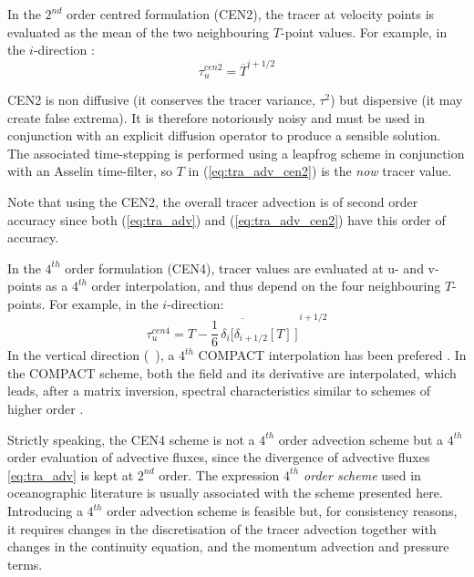 \documentclass[../main/NEMO_manual]{subfiles}
\begin{document}
In the $2^{nd}$ order centred formulation (CEN2), the tracer at velocity points is evaluated as the mean of
the two neighbouring $T$-point values.
For example, in the $i$-direction :
\begin{equation}
  \label{eq:tra_adv_cen2}
  \tau_u^{cen2} = \overline T ^{i + 1/2}
\end{equation}

CEN2 is non diffusive (\ie it conserves the tracer variance, $\tau^2$) but dispersive
(\ie it may create false extrema).
It is therefore notoriously noisy and must be used in conjunction with an explicit diffusion operator to
produce a sensible solution.
The associated time-stepping is performed using a leapfrog scheme in conjunction with an Asselin time-filter,
so $T$ in (\autoref{eq:tra_adv_cen2}) is the \textit{now} tracer value.

Note that using the CEN2, the overall tracer advection is of second order accuracy since
both (\autoref{eq:tra_adv}) and (\autoref{eq:tra_adv_cen2}) have this order of accuracy.


In the $4^{th}$ order formulation (CEN4), tracer values are evaluated at u- and v-points as
a $4^{th}$ order interpolation, and thus depend on the four neighbouring $T$-points.
For example, in the $i$-direction:
\begin{equation}
  \label{eq:tra_adv_cen4}
  \tau_u^{cen4} = \overline{T - \frac{1}{6} \, \delta_i \Big[ \delta_{i + 1/2}[T] \, \Big]}^{\,i + 1/2}
\end{equation}
In the vertical direction (~),
a $4^{th}$ COMPACT interpolation has been prefered \citep{Demange_PhD2014}.
In the COMPACT scheme, both the field and its derivative are interpolated, which leads, after a matrix inversion,
spectral characteristics similar to schemes of higher order \citep{Lele_JCP1992}. 

Strictly speaking, the CEN4 scheme is not a $4^{th}$ order advection scheme but
a $4^{th}$ order evaluation of advective fluxes,
since the divergence of advective fluxes \autoref{eq:tra_adv} is kept at $2^{nd}$ order.
The expression \textit{$4^{th}$ order scheme} used in oceanographic literature is usually associated with
the scheme presented here.
Introducing a  $4^{th}$ order advection scheme is feasible but, for consistency reasons,
it requires changes in the discretisation of the tracer advection together with changes in the continuity equation,
and the momentum advection and pressure terms.
\end{document}
